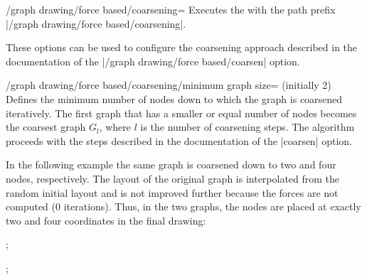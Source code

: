 \begin{key}{/graph drawing/force based/coarsening=}
  Executes the  with the path prefix 
  |/graph drawing/force based/coarsening|.

  These options can be used to configure the coarsening approach
  described in the documentation of the 
  |/graph drawing/force based/coarsen| option.
\end{key}

\begin{key}{/graph drawing/force based/coarsening/minimum graph
  size= (initially 2)}
  Defines the minimum number of nodes down to which the graph is 
  coarsened iteratively. The first graph that has a smaller or equal 
  number of nodes becomes the coarsest graph $G_l$, where $l$ is the 
  number of coarsening steps. The algorithm proceeds with the steps 
  described in the documentation of the |coarsen| option.

  In the following example the same graph is coarsened down to two
  and four nodes, respectively. The layout of the original graph is 
  interpolated from the random initial layout and is not improved
  further because the forces are not computed (0 iterations). Thus, 
  in the two graphs, the nodes are placed at exactly two and four
  coordinates in the final drawing:
  \begin{codeexample}[width=5.5cm]
\tikz {};

\tikz {};
  \end{codeexample}
\end{key}

